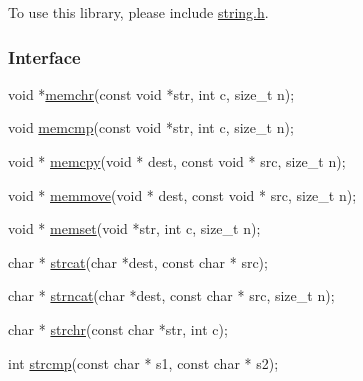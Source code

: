 To use this library, please include {\ttfamily \mbox{\hyperlink{a00038}{string.\+h}}}.

\subsubsection*{Interface}


\begin{DoxyCode}
\textcolor{keywordtype}{void} *\mbox{\hyperlink{a00038_af2c756015b1cb92274fc019a175ae8bb}{memchr}}(\textcolor{keyword}{const} \textcolor{keywordtype}{void} *str, \textcolor{keywordtype}{int} c, \textcolor{keywordtype}{size\_t} n);

\textcolor{keywordtype}{void} \mbox{\hyperlink{a00038_ace6c4869ab3af01c6f27eac47773917a}{memcmp}}(\textcolor{keyword}{const} \textcolor{keywordtype}{void} *str, \textcolor{keywordtype}{int} c, \textcolor{keywordtype}{size\_t} n);

\textcolor{keywordtype}{void} * \mbox{\hyperlink{a00038_a14938524dcbeb59d7117ba5e151ad1b1}{memcpy}}(\textcolor{keywordtype}{void} * dest, \textcolor{keyword}{const} \textcolor{keywordtype}{void} * src, \textcolor{keywordtype}{size\_t} n);

\textcolor{keywordtype}{void} * \mbox{\hyperlink{a00038_a802c986820d3866639922b6bc9484f90}{memmove}}(\textcolor{keywordtype}{void} * dest, \textcolor{keyword}{const} \textcolor{keywordtype}{void} * src, \textcolor{keywordtype}{size\_t} n);

\textcolor{keywordtype}{void} * \mbox{\hyperlink{a00038_a48a16bf628904bdd1b28cbaedf934868}{memset}}(\textcolor{keywordtype}{void} *str, \textcolor{keywordtype}{int} c, \textcolor{keywordtype}{size\_t} n);

\textcolor{keywordtype}{char} * \mbox{\hyperlink{a00038_adb8723e585ed29f2370cddf90f6891bc}{strcat}}(\textcolor{keywordtype}{char} *dest, \textcolor{keyword}{const} \textcolor{keywordtype}{char} * src);

\textcolor{keywordtype}{char} * \mbox{\hyperlink{a00038_a0aee928c2844a269966e4832fd2255c5}{strncat}}(\textcolor{keywordtype}{char} *dest, \textcolor{keyword}{const} \textcolor{keywordtype}{char} * src, \textcolor{keywordtype}{size\_t} n);

\textcolor{keywordtype}{char} * \mbox{\hyperlink{a00038_afcd97f487174f9092b0f23c7ac78a55a}{strchr}}(\textcolor{keyword}{const} \textcolor{keywordtype}{char} *str, \textcolor{keywordtype}{int} c);

\textcolor{keywordtype}{int} \mbox{\hyperlink{a00038_a11bd144d7d44914099a3aeddf1c8567d}{strcmp}}(\textcolor{keyword}{const} \textcolor{keywordtype}{char} * s1, \textcolor{keyword}{const} \textcolor{keywordtype}{char} * s2);


\end{DoxyCode}
